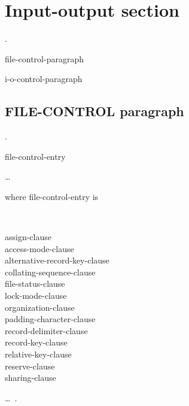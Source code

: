 \section{Input-output section}

\begin{0-1}
   .
\end{0-1}\newline
\begin{0-1}
  file-control-paragraph
\end{0-1}\newline
\begin{0-1}
  i-o-control-paragraph
\end{0-1}

\subsection{FILE-CONTROL paragraph}

\begin{0-1}
  .
\end{0-1}\newline
\begin{0-1}
  file-control-entry
\end{0-1} \ldots

\label{file-control-entry} where file-control-entry is

\begin{0-1}
   \\
\end{0-1}
\filename
\begin{0-1}
  assign-clause \\
  access-mode-clause \\
  alternative-record-key-clause \\
  collating-sequence-clause \\
  file-status-clause \\
  lock-mode-clause \\
  organization-clause \\
  padding-character-clause \\
  record-delimiter-clause \\
  record-key-clause \\
  relative-key-clause \\
  reserve-clause \\
  sharing-clause
\end{0-1}\ldots\ {}.

